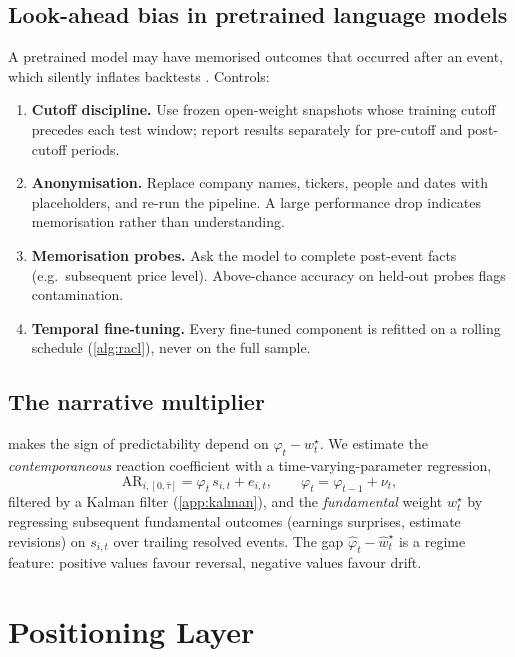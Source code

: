 \documentclass[11pt,a4paper]{article}
\theoremstyle{plain}
\theoremstyle{definition}
\theoremstyle{remark}
\begin{document}
\subsection{Look-ahead bias in pretrained language models}\label{sec:lookahead}
A pretrained model may have memorised outcomes that occurred after an event, which silently inflates backtests \citep{glasserman2023}. Controls:
\begin{enumerate}[label=(\roman*)]
  \item \textbf{Cutoff discipline.} Use frozen open-weight snapshots whose training cutoff precedes each test window; report results separately for pre-cutoff and post-cutoff periods.
  \item \textbf{Anonymisation.} Replace company names, tickers, people and dates with placeholders, and re-run the pipeline. A large performance drop indicates memorisation rather than understanding.
  \item \textbf{Memorisation probes.} Ask the model to complete post-event facts (e.g.\ subsequent price level). Above-chance accuracy on held-out probes flags contamination.
  \item \textbf{Temporal fine-tuning.} Every fine-tuned component is refitted on a rolling schedule (\cref{alg:racl}), never on the full sample.
\end{enumerate}

\subsection{The narrative multiplier}\label{sec:multiplier}
 makes the sign of predictability depend on $\varphi_t-w^\star_t$. We estimate the \emph{contemporaneous} reaction coefficient with a time-varying-parameter regression,
\begin{equation}
  \mathrm{AR}_{i,[0,\bar\tau]}=\varphi_t\, s_{i,t}+e_{i,t},\qquad \varphi_t=\varphi_{t-1}+\nu_t,
\end{equation}
filtered by a Kalman filter (\cref{app:kalman}), and the \emph{fundamental} weight $w^\star_t$ by regressing subsequent fundamental outcomes (earnings surprises, estimate revisions) on $s_{i,t}$ over trailing resolved events. The gap $\hat\varphi_t-\hat w^\star_t$ is a regime feature: positive values favour reversal, negative values favour drift.

\section{Positioning Layer}\label{sec:positioning}
\end{document}
